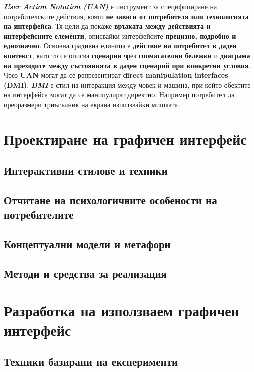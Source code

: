 \documentclass[fleqn,12pt]{article}
\begin{document}
\textit{\textbf{User Action Notation (UAN)}} е инструмент за специфициране на потребителските действия, която \textbf{не зависи от потребителя или технологията на интерфейса}.
Тя цели да покаже \textbf{връзката между действията и интерфейсните елементи}, описвайки интерфейсите \textbf{прецизно, подробно и еднозначно}.
\bigbreak
Основна градивна единица е \textbf{действие на потребител в даден контекст}, като то се описва \textbf{сценарии} чрез \textbf{спомагателни бележки} и \textbf{диаграма на преходите между състоянията в даден сценарий при конкретни условия}. 
\bigbreak
Чрез \textbf{UAN} могат да се репрезентират \textbf{direct manipulation interfaces (DMI)}.
\textit{\textbf{DMI}} е стил на интеракция между човек и машина, при който обектите на интерфейса могат да се манипулират директно.
Например потребител да преоразмери триъгълник на екрана използвайки мишката.

\section{Проектиране на графичен интерфейс}

\subsection{Интерактивни стилове и техники}


\subsection{Отчитане на психологичните особености на потребителите}
\subsection{Концептуални модели и метафори}

\subsection{Методи и средства за реализация}

\section{Разработка на използваем графичен интерфейс}

\subsection{Техники базирани на експерименти}
\end{document}
